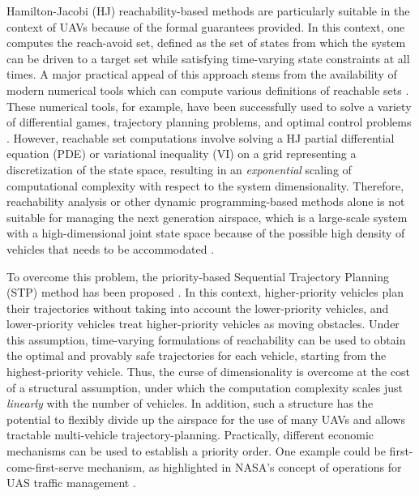 Hamilton-Jacobi (HJ) reachability-based methods \cite{Barron90, Mitchell05, Bokanowski10, Bokanowski11, Margellos11, Fisac15} are particularly suitable in the context of UAVs because of the formal guarantees provided. In this context, one computes the reach-avoid set, defined as the set of states from which the system can be driven to a target set while satisfying time-varying state constraints at all times. A major practical appeal of this approach stems from the availability of modern numerical tools which can compute various definitions of reachable sets \cite{Sethian96, Osher02, Mitchell02, Mitchell07b}. These numerical tools, for example, have been successfully used to solve a variety of differential games, trajectory planning problems, and optimal control problems \cite{Bayen07, Ding08, Bouffard12, Huang11}. 
However, reachable set computations involve solving a HJ partial differential equation (PDE) or variational inequality (VI) on a grid representing a discretization of the state space, resulting in an \textit{exponential} scaling of computational complexity with respect to the system dimensionality. Therefore, reachability analysis or other dynamic programming-based methods alone is not suitable for managing the next generation airspace, which is a large-scale system with a high-dimensional joint state space because of the possible high density of vehicles that needs to be accommodated \cite{Kopardekar16}.  

To overcome this problem, the priority-based Sequential Trajectory Planning (STP) method has been proposed \cite{Chen15c, Bansal2017}. In this context, higher-priority vehicles plan their trajectories without taking into account the lower-priority vehicles, and lower-priority vehicles treat higher-priority vehicles as moving obstacles. Under this assumption, time-varying formulations of reachability \cite{Bokanowski11, Fisac15} can be used to obtain the optimal and provably safe trajectories for each vehicle, starting from the highest-priority vehicle. Thus, the curse of dimensionality is overcome at the cost of a structural assumption, under which the computation complexity scales just \textit{linearly} with the number of vehicles. In addition, such a structure has the potential to flexibly divide up the airspace for the use of many UAVs and allows tractable multi-vehicle trajectory-planning. Practically, different economic mechanisms can be used to establish a priority order. One example could be first-come-first-serve mechanism, as highlighted in NASA's concept of operations for UAS traffic management \cite{Kopardekar16}.

